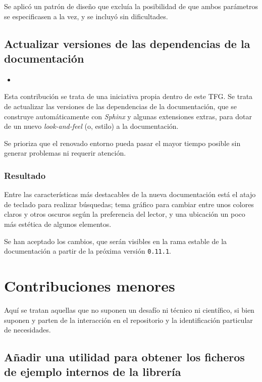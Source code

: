 Se aplicó un patrón de diseño que excluía la posibilidad de que ambos parámetros se especificasen a la vez, y se incluyó sin dificultades.

\subsection{Actualizar versiones de las dependencias de la documentación}

\begin{itemize}
    \item {}
\end{itemize}

Esta contribución se trata de una iniciativa propia dentro de este TFG. Se trata de actualizar las versiones de las dependencias de la documentación, que se construye automáticamente con \textit{Sphinx} y algunas extensiones extras, para dotar de un nuevo \textit{look-and-feel} (o, estilo) a la documentación.

Se prioriza que el renovado entorno pueda pasar el mayor tiempo posible sin generar problemas ni requerir atención.

\subsubsection{Resultado}

Entre las características más destacables de la nueva documentación está el atajo de teclado para realizar búsquedas; tema gráfico para cambiar entre unos colores claros y otros oscuros según la preferencia del lector, y una ubicación un poco más estética de algunos elementos.

Se han aceptado los cambios, que serán visibles en la rama estable de la documentación a partir de la próxima versión \texttt{0.11.1}.

\section{Contribuciones menores} \label{sct:desarrollo:contribuciones_menores}

Aquí se tratan aquellas que no suponen un desafío ni técnico ni científico, si bien suponen y parten de la interacción en el repositorio y la identificación particular de necesidades.

\subsection{Añadir una utilidad para obtener los ficheros de ejemplo internos de la librería}


